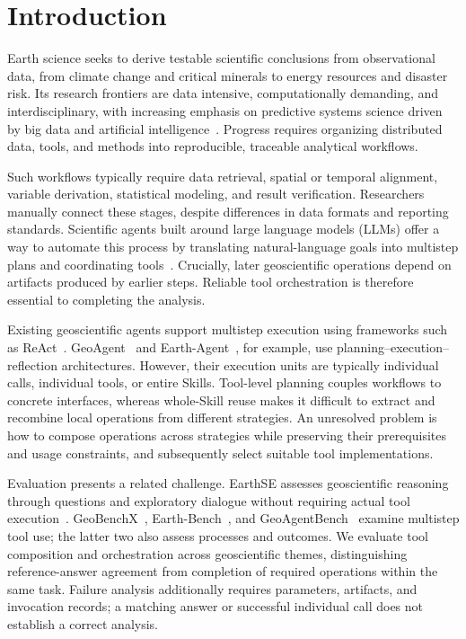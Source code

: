 \section{Introduction}
\label{sec:introduction}
Earth science seeks to derive testable scientific conclusions from observational data, from climate change and critical minerals to energy resources and disaster risk. Its research frontiers are data intensive, computationally demanding, and interdisciplinary, with increasing emphasis on predictive systems science driven by big data and artificial intelligence~\cite{zheng2025frontiers}. Progress requires organizing distributed data, tools, and methods into reproducible, traceable analytical workflows.

Such workflows typically require data retrieval, spatial or temporal alignment, variable derivation, statistical modeling, and result verification. Researchers manually connect these stages, despite differences in data formats and reporting standards. Scientific agents built around large language models (LLMs) offer a way to automate this process by translating natural-language goals into multistep plans and coordinating tools~\cite{feng2026earthagent,ding2025scitoolagent}. Crucially, later geoscientific operations depend on artifacts produced by earlier steps. Reliable tool orchestration is therefore essential to completing the analysis.

Existing geoscientific agents support multistep execution using frameworks such as ReAct~\cite{yao2023react}. GeoAgent~\cite{chen2024geoagent} and Earth-Agent~\cite{feng2026earthagent}, for example, use planning--execution--reflection architectures. However, their execution units are typically individual calls, individual tools, or entire Skills. Tool-level planning couples workflows to concrete interfaces, whereas whole-Skill reuse makes it difficult to extract and recombine local operations from different strategies. An unresolved problem is how to compose operations across strategies while preserving their prerequisites and usage constraints, and subsequently select suitable tool implementations.

Evaluation presents a related challenge. EarthSE assesses geoscientific reasoning through questions and exploratory dialogue without requiring actual tool execution~\cite{xu2025earthse}. GeoBenchX~\cite{krechetova2025geobenchx}, Earth-Bench~\cite{feng2026earthagent}, and GeoAgentBench~\cite{yu2026geoagentbench} examine multistep tool use; the latter two also assess processes and outcomes. We evaluate tool composition and orchestration across geoscientific themes, distinguishing reference-answer agreement from completion of required operations within the same task. Failure analysis additionally requires parameters, artifacts, and invocation records; a matching answer or successful individual call does not establish a correct analysis.

